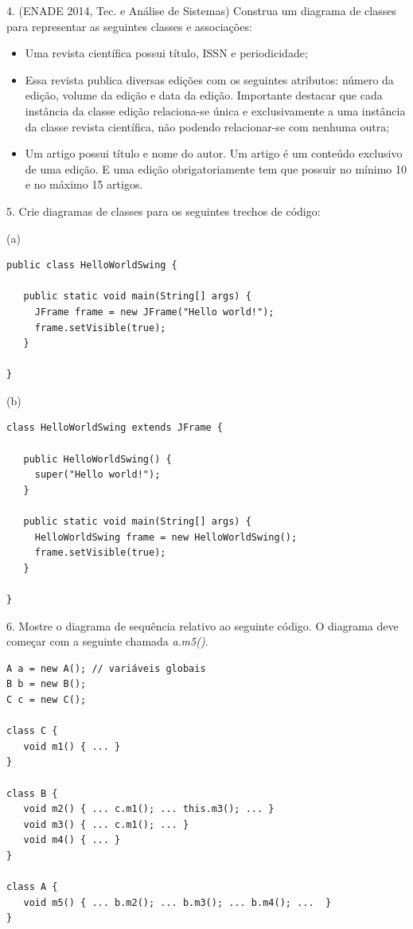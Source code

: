 \documentclass[
  11pt,
  twoside]{book}
\begin{document}
4. (ENADE 2014, Tec. e Análise de Sistemas) Construa um diagrama de
classes para representar as seguintes classes e associações:

\begin{itemize}
\item
  Uma revista científica possui título, ISSN e periodicidade;
\item
  Essa revista publica diversas edições com os seguintes atributos:
  número da edição, volume da edição e data da edição. Importante
  destacar que cada instância da classe edição relaciona-se única e
  exclusivamente a uma instância da classe revista científica, não
  podendo relacionar-se com nenhuma outra;
\item
  Um artigo possui título e nome do autor. Um artigo é um conteúdo
  exclusivo de uma edição. E uma edição obrigatoriamente tem que possuir
  no mínimo 10 e no máximo 15 artigos.
\end{itemize}

5. Crie diagramas de classes para os seguintes trechos de código:

(a)

\begin{lstlisting}
public class HelloWorldSwing { 

   public static void main(String[] args) {
     JFrame frame = new JFrame("Hello world!");
     frame.setVisible(true);
   }

}
\end{lstlisting}

(b)

\begin{lstlisting}
class HelloWorldSwing extends JFrame {

   public HelloWorldSwing() {
     super("Hello world!");
   }

   public static void main(String[] args) {
     HelloWorldSwing frame = new HelloWorldSwing();
     frame.setVisible(true);
   }

}
\end{lstlisting}

6. Mostre o diagrama de sequência relativo ao seguinte código. O
diagrama deve começar com a seguinte chamada \emph{a}.\emph{m5()}.

\begin{lstlisting}
A a = new A(); // variáveis globais
B b = new B();
C c = new C();

class C { 
   void m1() { ... } 
}

class B { 
   void m2() { ... c.m1(); ... this.m3(); ... }   
   void m3() { ... c.m1(); ... }
   void m4() { ... }
}

class A { 
   void m5() { ... b.m2(); ... b.m3(); ... b.m4(); ...  }   
}     
\end{lstlisting}
\end{document}
